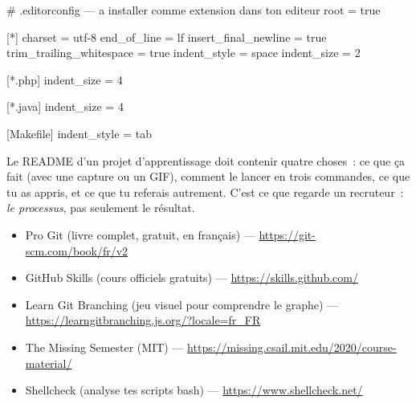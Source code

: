 \documentclass[12pt,a4paper,twoside,openright]{book}
\newcommand{\fichier}[1]{\texttt{\color{pathgreen}#1}}
\providecommand{\cmd}[1]{}%
\renewcommand{\cmd}[1]{\srcbox{\texttt{\detokenize{#1}}}}
\begin{document}
\begin{codeconf}
# .editorconfig --- a installer comme extension dans ton editeur
root = true

[*]
charset = utf-8
end_of_line = lf
insert_final_newline = true
trim_trailing_whitespace = true
indent_style = space
indent_size = 2

[*.php]
indent_size = 4

[*.java]
indent_size = 4

[Makefile]
indent_style = tab
\end{codeconf}

Le README d'un projet d'apprentissage doit contenir quatre choses~: ce que \c{c}a fait
(avec une capture ou un GIF), comment le lancer en trois commandes, ce que tu as appris,
et ce que tu referais autrement. C'est ce que regarde un recruteur~: \emph{le processus},
pas seulement le r\'esultat.

\begin{exercice}
\end{exercice}

\begin{ressources}
\begin{itemize}
  \item Pro Git (livre complet, gratuit, en fran\c{c}ais) --- \url{https://git-scm.com/book/fr/v2}
  \item GitHub Skills (cours officiels gratuits) --- \url{https://skills.github.com/}
  \item Learn Git Branching (jeu visuel pour comprendre le graphe) --- \url{https://learngitbranching.js.org/?locale=fr_FR}
  \item The Missing Semester (MIT) --- \url{https://missing.csail.mit.edu/2020/course-material/}
  \item Shellcheck (analyse tes scripts bash) --- \url{https://www.shellcheck.net/}
\end{itemize}
\end{ressources}
\end{document}
